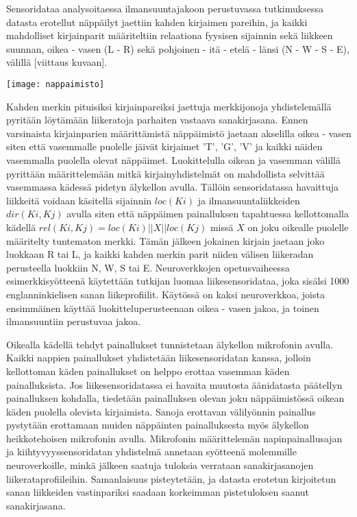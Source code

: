 \documentclass[finnish]{tktltiki2}
\theoremstyle{definition}
\theoremstyle{remark}
\begin{document}
Sensoridataa analysoitaessa ilmansuuntajakoon perustuvassa tutkimuksessa~\cite{maiti} datasta erotellut näppäilyt jaettiin kahden kirjaimen pareihin, ja kaikki mahdolliset kirjainparit määriteltiin relaationa fyysisen sijainnin sekä liikkeen suunnan, oikea - vasen (L - R) sekä pohjoinen - itä - etelä - länsi (N - W -
S - E), välillä [viittaus kuvaan].

\texttt{[image: nappaimisto]}

Kahden merkin pituisiksi kirjainpareiksi jaettuja merkkijonoja yhdistelemällä pyritään löytämään liikeratoja parhaiten vastaava sanakirjasana. Ennen varsinaista kirjainparien määrittämistä näppäimistö jaetaan akselilla oikea - vasen siten että vasemmalle puolelle jäivät kirjaimet 'T', 'G', 'V' ja kaikki näiden vasemmalla puolella olevat näppäimet. Luokittelulla oikean ja vasemman välillä pyrittään määrittelemään mitkä kirjainyhdistelmät on mahdollista selvittää vasemmassa kädessä pidetyn älykellon avulla. Tällöin sensoridatassa havaittuja liikkeitä voidaan käsitellä sijainnin $loc(Ki)$ ja ilmansuuntaliikkeiden $dir(Ki, Kj)$ avulla siten että näppäimen painalluksen tapahtuessa kellottomalla kädellä $rel(Ki, Kj) = loc(Ki) || X || loc(Kj)$ missä $X$ on joku oikealle puolelle määritelty tuntematon merkki. Tämän jälkeen jokainen kirjain jaetaan joko luokkaan R tai L, ja kaikki kahden merkin parit niiden välisen liikeradan perusteella luokkiin N, W, S tai E.
Neuroverkkojen opetusvaiheessa esimerkkisyötteenä käytettään tutkijan luomaa liikesensoridataa, joka sisälsi 1000 englanninkielisen sanan liikeprofiilit. Käytössä on kaksi neuroverkkoa, joista ensimmäinen käyttää luokitteluperusteenaan oikea - vasen jakoa, ja toinen ilmansuuntiin perustuvaa jakoa. 

Oikealla kädellä tehdyt painallukset tunnistetaan älykellon mikrofonin avulla. Kaikki nappien painallukset yhdistetään liikesensoridatan kanssa, jolloin kellottoman käden painallukset on helppo erottaa vasemman käden painalluksista. Jos liikesensoridatassa ei havaita muutosta äänidatasta päätellyn painalluksen kohdalla, tiedetään painalluksen olevan joku näppäimistössä oikean käden puolella olevista kirjaimista. Sanoja erottavan välilyönnin painallus pystytään erottamaan muiden näppäinten painalluksesta myös älykellon heikkotehoisen mikrofonin avulla. Mikrofonin määrittelemän napinpainallusajan ja kiihtyvyyssensoridatan yhdistelmä annetaan syötteenä molemmille neuroverkoille, minkä jälkeen saatuja tuloksia verrataan sanakirjasanojen liikerataprofiileihin. Samanlaisuus pisteytetään, ja datasta erotetun kirjoitetun sanan liikkeiden vastinpariksi saadaan korkeimman pistetuloksen saanut sanakirjasana. 
\end{document}
